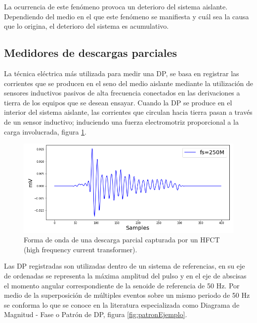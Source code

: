 La ocurrencia de este fenómeno provoca un deterioro del sistema aislante. Dependiendo del medio en el que este fenómeno se manifiesta y cuál sea la causa que lo origina, el deterioro del sistema es acumulativo.

\subsection{Medidores de descargas parciales}
La técnica eléctrica más utilizada para medir una DP, se basa en registrar las corrientes que se producen en el seno del medio aislante mediante la utilización de sensores inductivos pasivos de alta frecuencia conectados en las derivaciones a tierra de los equipos que se desean ensayar.
Cuando la DP se produce en el interior del sistema aislante, las corrientes que circulan hacia tierra pasan a través de un sensor inductivo; induciendo una fuerza electromotriz proporcional a la carga involucrada, figura \ref{fig:dpEjemplo}.

\begin{figure}[ht]
	\centering
	\includegraphics[width=\textwidth]{./Figures/dpEjemplo.png}
	\caption{Forma de onda de una descarga parcial capturada por un HFCT (high frequency current transformer).}
	\label{fig:dpEjemplo}
\end{figure}

Las DP registradas son utilizadas dentro de un sistema de referencias, en su eje de ordenadas se representa la máxima amplitud del pulso y en el eje de abscisas el momento angular correspondiente de la senoide de referencia de 50 Hz. Por medio de la superposición de múltiples eventos sobre un mismo periodo de 50 Hz se conforma lo que se conoce en la literatura especializada como Diagrama de Magnitud - Fase o Patrón de DP, figura \ref{fig:patronEjemplo}.

